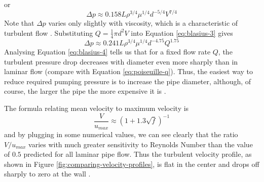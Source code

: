 \documentclass[9pt]{article} %
\numberwithin{equation}{section} %
\begin{document}
\begin{multicols}{2}
\begin{equation}
\end{equation}
or
\begin{equation} \label{eq:blasius-3}
\Delta p \approx 0.158 L \rho^{3/4} \mu^{1/4} d^{-5/4} V^{7/4}
\end{equation}
Note that $\Delta p$ varies only slightly with viscosity, which is a characteristic of turbulent flow \cite{fluid-mechanics}. Substituting $Q = \frac{1}{4} \pi d^{2} V$ into Equation \ref{eq:blasius-3} gives
\begin{equation} \label{eq:blasius-4}
\Delta p \approx 0.241 L \rho^{3/4} \mu^{1/4} d^{-4.75} Q^{1.75}
\end{equation}
Analysing Equation \ref{eq:blasius-4} tells us that for a fixed flow rate $Q$, the turbulent pressure drop decreases with diameter even more sharply than in laminar flow (compare with Equation \ref{eq:poiseuille-q}). Thus, the easiest way to reduce required pumping pressure is to increase the pipe diameter, although, of course, the larger the pipe the more expensive it is \cite{fluid-mechanics}.

The formula relating mean velocity to maximum velocity is
\begin{equation}
\frac{V}{u_{max}} \approx (1+1.3 \sqrt{f})^{-1}
\end{equation}
and by plugging in some numerical values, we can see clearly that the ratio $V/u_{max}$ varies with much greater sensitivity to Reynolds Number than the value of $0.5$ predicted for all laminar pipe flow. Thus the turbulent velocity profile, as shown in Figure \ref{fig:comparing-velocity-profiles}, is flat in the center and drops off sharply to zero at the wall \cite{fluid-mechanics}.


\end{multicols}
\end{document}
